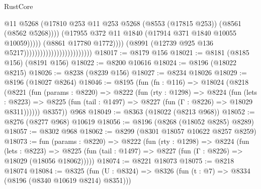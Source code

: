 \begin{lexlean}{RustCore}
\begin{coremodule}
                                                                @11
                                                                @5268
                                                                (@17810
                                                                  @253
                                                                  @11
                                                                  @253
                                                                  @5268
                                                                  (@8553 (@17815 @253))
                                                                  (@8561 (@8562 @5268))))
                                                              (@17955
                                                                @372
                                                                @11
                                                                @1840
                                                                (@17914
                                                                  @371
                                                                  @1840
                                                                  @10055
                                                                  @10059)))))
                                                        (@8861 @17780 @1772))))
                                                  (@8991
                                                    (@12739 @925 @136 @5217)))))))))))))))))))))))))
@18017 := @8179 @156
@18021 := @8181 (@8185 @156) (@8191 @156)
@18022 := @8200 @10616
@18024 := @8196 (@18022 @8215)
@18026 := @8238 (@8239 @156)
@18027 := @8234 @18026
@18029 := @8196 (@18027 @8264)
@18046 := @8195
    (fun (fn : @116) =>
    @18024
      (@8218
        (@8221
          (fun (params : @8220) =>
          @8222
            (fun (rty : @1298) =>
            @8224
              (fun (lets : @8223) =>
              @8225 (fun (tail : @1497) => @8227 (fun (Γ : @8226) => @18029 @8311))))))
        @8357))
    @968
@18049 := @8363 (@18022 (@8213 @968))
@18052 := @8276 (@8277 @968) @10619
@18056 := @8196 (@8268 (@18052 @8285) @8289)
@18057 := @8302 @968
@18062 := @8299 (@8301 @18057 @10622 @8257 @8259)
@18073 := fun (params : @8220) =>
  @8222
    (fun (rty : @1298) =>
    @8224
      (fun (lets : @8223) =>
      @8225 (fun (tail : @1497) => @8227 (fun (Γ : @8226) => @18029 (@18056 @18062)))))
@18074 := @8221 @18073
@18075 := @8218 @18074
@18084 := @8325
    (fun (U : @8324) => @8326 (fun (t : @7) => @8334 (@8196 (@8340 @10619 @8214) @8351)))

\end{coremodule}
\end{lexlean}
